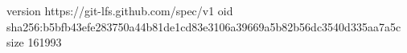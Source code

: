 version https://git-lfs.github.com/spec/v1
oid sha256:b5bfb43efe283750a44b81de1cd83e3106a39669a5b82b56dc3540d335aa7a5c
size 161993
